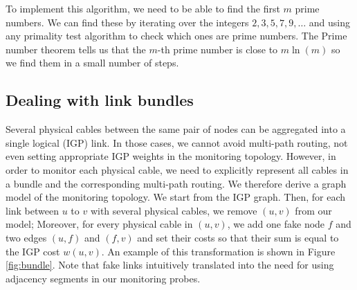 To implement this algorithm, we need to be able to find the first $m$ prime numbers. We can find these by iterating over the integers $2, 3, 5, 7, 9, \ldots$
and using any primality test algorithm to check which ones are prime numbers. The Prime number theorem \cite{cormen} %
tells us that the $m$-th prime number is close to $m \ln(m)$ so we find them in a small number of steps.

\subsection{Dealing with link bundles}

Several physical cables between the same pair of nodes can be aggregated into a single logical (IGP) link.
In those cases, we cannot avoid multi-path routing, not even setting appropriate IGP weights in the monitoring topology.
However, in order to monitor each physical cable, we need to explicitly represent all cables in a bundle and the corresponding multi-path routing.
We therefore derive a graph model of the monitoring topology.
We start from the IGP graph.
Then, for each link between $u$ to $v$ with several physical cables, we remove $(u,v)$ from our model; Moreover, for every physical cable in $(u,v)$, we add one fake node $f$ and two edges $(u,f)$ and $(f,v)$ and set their costs so that their sum is equal to the IGP cost $w(u,v)$.
An example of this transformation is shown in Figure \ref{fig:bundle}.
Note that fake links intuitively translated into the need for using adjacency segments in our monitoring probes.

